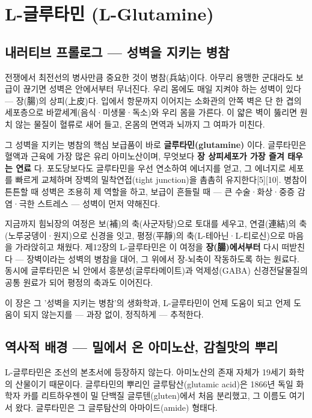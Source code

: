 \documentclass[11pt,oneside]{book}
\begin{document}

\chapter{L-글루타민 (L-Glutamine)}

\section{내러티브 프롤로그 — 성벽을 지키는 병참}
전쟁에서 최전선의 병사만큼 중요한 것이 병참(兵站)이다. 아무리 용맹한 군대라도 보급이 끊기면 성벽은 안에서부터 무너진다. 우리 몸에도 매일 지켜야 하는 성벽이 있다 — 장(腸)의 상피(上皮)다. 입에서 항문까지 이어지는 소화관의 안쪽 벽은 단 한 겹의 세포층으로 바깥세계(음식·미생물·독소)와 우리 몸을 가른다. 이 얇은 벽이 뚫리면 원치 않는 물질이 혈류로 새어 들고, 온몸의 면역과 뇌까지 그 여파가 미친다.

그 성벽을 지키는 병참의 핵심 보급품이 바로 \textbf{글루타민(glutamine)} 이다. 글루타민은 혈액과 근육에 가장 많은 유리 아미노산이며, 무엇보다 \textbf{장 상피세포가 가장 즐겨 태우는 연료} 다. 포도당보다도 글루타민을 우선 연소하여 에너지를 얻고, 그 에너지로 세포를 빠르게 교체하며 장벽의 밀착연접(tight junction)을 촘촘히 유지한다[5][10]. 병참이 튼튼할 때 성벽은 조용히 제 역할을 하고, 보급이 흔들릴 때 — 큰 수술·화상·중증 감염·극한 스트레스 — 성벽이 먼저 약해진다.

지금까지 힘뇌장의 여정은 보(補)의 축(사군자탕)으로 토대를 세우고, 연결(連結)의 축(노루궁뎅이·원지)으로 신경을 잇고, 평정(平靜)의 축(L-테아닌·L-티로신)으로 마음을 가라앉히고 채웠다. 제12장의 L-글루타민은 이 여정을 \textbf{장(腸)에서부터} 다시 떠받친다 — 장벽이라는 성벽의 병참을 대어, 그 위에서 장-뇌축이 작동하도록 하는 원료다. 동시에 글루타민은 뇌 안에서 흥분성(글루타메이트)과 억제성(GABA) 신경전달물질의 공통 원료가 되어 평정의 축과도 이어진다.

이 장은 그 '성벽을 지키는 병참'의 생화학과, L-글루타민이 언제 도움이 되고 언제 도움이 되지 않는지를 — 과장 없이, 정직하게 — 추적한다.

\section{역사적 배경 — 밀에서 온 아미노산, 감칠맛의 뿌리}
L-글루타민은 조선의 본초서에 등장하지 않는다. 아미노산의 존재 자체가 19세기 화학의 산물이기 때문이다. 글루타민의 뿌리인 글루탐산(glutamic acid)은 1866년 독일 화학자 카를 리트하우젠이 밀 단백질 글루텐(gluten)에서 처음 분리했고, 그 이름도 여기서 왔다. 글루타민은 그 글루탐산의 아마이드(amide) 형태다.
\end{document}
